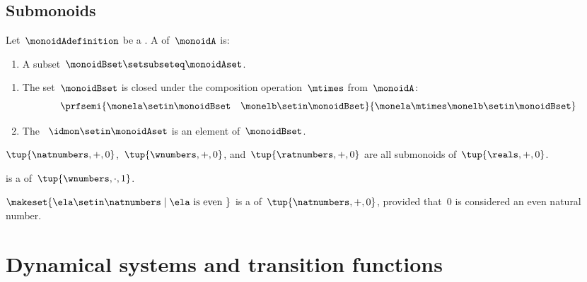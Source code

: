 \subsection{Submonoids}


\begin{definition}[Submonoids]\label{def:submonoids}
    Let~$\monoidAdefinition$ be a .
    A  of~$\monoidA$ is:

    \constit

    \begin{enumerate}
        \item A subset~$\monoidBset \setsubseteq \monoidAset$.
    \end{enumerate}

    \condit

    \begin{enumerate}
        \item The set~$\monoidBset$ is closed under the composition operation~$\mtimes$ from~$\monoidA$:
              \begin{equation}
                  \prfsemi{\monela \setin \monoidBset \quad \monelb \setin \monoidBset}{\monela \mtimes \monelb \setin \monoidBset}
              \end{equation}

        \item The ~$\idmon \setin \monoidAset$ is an element of~$\monoidBset$.
    \end{enumerate}
\end{definition}

\begin{example}
    $\tup{\natnumbers, +, 0}$,~$\tup{\wnumbers, +, 0}$, and~$\tup{\ratnumbers, +, 0}$ are all submonoids of~$\tup{\reals, +, 0}$.
\end{example}

\begin{example}
    \natnumbers  is a  of~$\tup{\wnumbers, \cdot, 1}$.
\end{example}

\begin{example}
    $\makeset{ \ela \setin \natnumbers \mid \ela \text{ is even } }$ is a  of~$\tup{\natnumbers, +, 0}$, provided that~$0$ is considered an even natural number.
\end{example}

\section[Dynamical systems]{Dynamical systems and transition functions}

